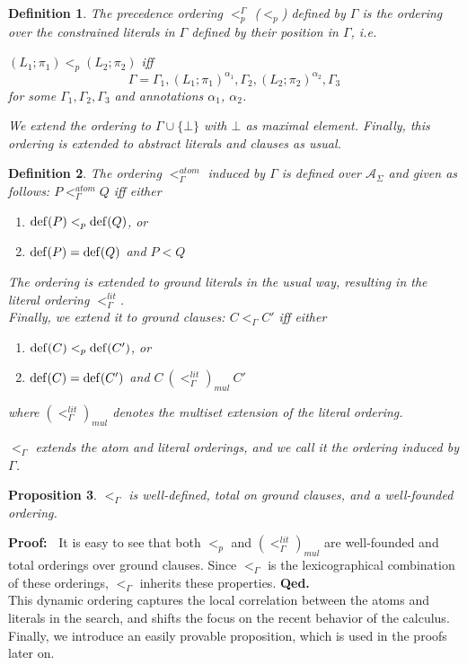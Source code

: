 \documentclass[a4paper]{article}
\newcommand{\startproof}{{\bf Proof:~}}
\newcommand{\finishproof}{{\bf Qed.}}
\newcommand{\leaveabit}{\\[6 pt]}
\newtheorem{defi}{Definition}[section]
\newtheorem{prop}[defi]{Proposition}
\begin{document}
\begin{defi} \emph{The precedence ordering $<_p^{\Gamma}$ ($<_p$) defined by $\Gamma$}
is the ordering over the constrained literals in $\Gamma$ defined by their position in $\Gamma$, i.e.\

$(L_1; \pi_1) <_p (L_2; \pi_2)$ iff 
\[\Gamma = \Gamma_1, (L_1; \pi_1)^{\alpha_1}, \Gamma_2, (L_2; \pi_2)^{\alpha_2}, \Gamma_3\]
for some $\Gamma_1, \Gamma_2, \Gamma_3$ and annotations $\alpha_1$, $\alpha_2$.

We extend the ordering to $\Gamma\cup\{\bot\}$ with $\bot$ as maximal element. 
Finally, this ordering is extended to abstract literals and clauses as usual.
\end{defi}



\begin{defi}\label{a-inducedOrderDef2}
\emph{The ordering $<^{atom}_{\Gamma}$ induced by $\Gamma$} is defined over $\mathcal{A}_{\Sigma}$ and given as follows: $P <^{atom}_{\Gamma} Q$ iff either
\begin{enumerate}
	\item $\operatorname{def}(P) <_p \operatorname{def}(Q)$, or
	\item $\operatorname{def}(P) = \operatorname{def}(Q)$ and $P < Q$
\end{enumerate}
The ordering is extended to ground literals in the usual way, resulting in the literal ordering $<^{lit}_{\Gamma}$. 
\leaveabit
Finally, we extend it to ground clauses: $C <_{\Gamma} C'$ iff either
\begin{enumerate}
	\item $\operatorname{def}(C) <_p \operatorname{def}(C')$, or
	\item $\operatorname{def}(C) = \operatorname{def}(C')$ and $C~(<^{lit}_{\Gamma})_{mul}~C'$
\end{enumerate}
where $(<^{lit}_{\Gamma})_{mul}$ denotes the multiset extension of the literal ordering. 

$<_{\Gamma}$ extends the atom and literal orderings, and 
we call it \emph{the ordering induced by $\Gamma$}.
\end{defi}

\begin{prop}
$<_{\Gamma}$ is well-defined, total on ground clauses, and a well-founded ordering.
\end{prop}
\startproof 
It is easy to see that both $<_p$ and $(<_{\Gamma}^{lit})_{mul}$ are well-founded and total orderings 
over ground clauses. 
Since $<_{\Gamma}$ is the lexicographical combination of these orderings, $<_{\Gamma}$ inherits these properties.
\finishproof\leaveabit\indent
This dynamic ordering captures the local correlation between 
the atoms and literals in the search, and shifts the focus on the 
recent behavior of the calculus.
Finally, we introduce an easily provable proposition, which is used in the proofs later on.
\end{document}

